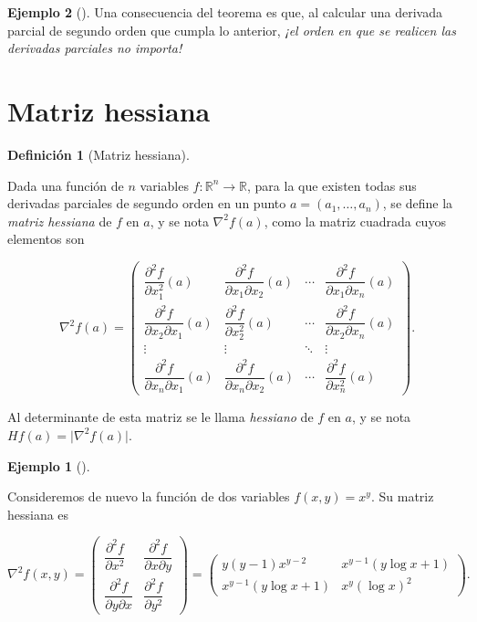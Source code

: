 \documentclass[
  a4paper,
]{scrreport}
\theoremstyle{definition}
\newtheorem{example}{Ejemplo}[chapter]
\theoremstyle{plain}
\theoremstyle{definition}
\newtheorem{definition}{Definición}[chapter]
\theoremstyle{definition}
\theoremstyle{plain}
\theoremstyle{plain}
\theoremstyle{remark}
\begin{document}
\begin{example}[]
Una consecuencia del teorema es que, al calcular una derivada parcial de
segundo orden que cumpla lo anterior, \emph{¡el orden en que se realicen
las derivadas parciales no importa!}

\section{Matriz hessiana}\label{matriz-hessiana}

\begin{definition}[Matriz
hessiana]\protect\hypertarget{def-matriz-hessiana}{}\label{def-matriz-hessiana}

Dada una función de \(n\) variables
\(f:\mathbb{R}^n\rightarrow \mathbb{R}\), para la que existen todas sus
derivadas parciales de segundo orden en un punto \(a=(a_1,\ldots,a_n)\),
se define la \emph{matriz hessiana} de \(f\) en \(a\), y se nota
\(\nabla^2f(a)\), como la matriz cuadrada cuyos elementos son

\[\nabla^2f(a)=\left(
\begin{array}{cccc}
\dfrac{\partial^2 f}{\partial x_1^2}(a) &
\dfrac{\partial^2 f}{\partial x_1 \partial x_2}(a) &
\cdots &
\dfrac{\partial^2 f}{\partial x_1 \partial x_n}(a)\\
\dfrac{\partial^2 f}{\partial x_2 \partial x_1}(a) &
\dfrac{\partial^2 f}{\partial x_2^2}(a) &
\cdots &
\dfrac{\partial^2 f}{\partial x_2 \partial x_n}(a)\\
\vdots & \vdots & \ddots & \vdots \\
\dfrac{\partial^2 f}{\partial x_n \partial x_1}(a) &
\dfrac{\partial^2 f}{\partial x_n \partial x_2}(a) &
\cdots &
\dfrac{\partial^2 f}{\partial x_n^2}(a)
\end{array}
\right).\]

Al determinante de esta matriz se le llama \emph{hessiano} de \(f\) en
\(a\), y se nota \(Hf(a)=\lvert \nabla^2f(a)\rvert\).

\end{definition}

\begin{example}[]\protect\hypertarget{exm-matriz-hessiana}{}\label{exm-matriz-hessiana}

Consideremos de nuevo la función de dos variables \(f(x,y)=x^y\). Su
matriz hessiana es

\[\nabla^2f(x,y)=\left(
\begin{array}{cc}
\dfrac{\partial^2 f}{\partial x^2} & \dfrac{\partial^2 f}{\partial x \partial y}\\
\dfrac{\partial^2 f}{\partial y \partial x} & \dfrac{\partial^2 f}{\partial y^2}
\end{array}
\right)
=
\left(
\begin{array}{cc}
y(y-1)x^{y-2} & x^{y-1}(y\log x+1) \\
x^{y-1}(y\log x+1) & x^y(\log x)^2
\end{array}
\right).\]


\end{example}
\end{example}
\end{document}
